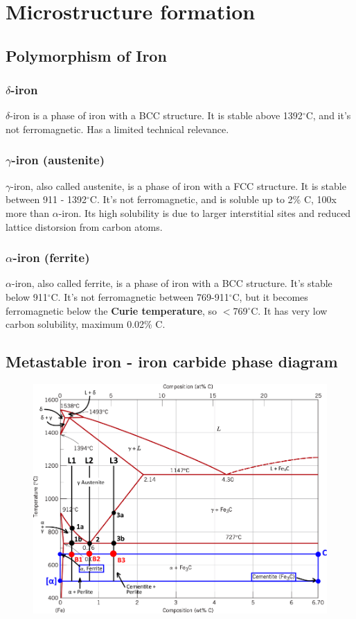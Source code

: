 \documentclass{article}
\begin{document}
\section{Microstructure formation}
\subsection{Polymorphism of Iron}
\subsubsection{$\delta$-iron}
$\delta$-iron is a phase of iron with a BCC structure. It is stable above 1392$^\circ$C, and
it's not ferromagnetic. Has a limited technical relevance.

\subsubsection{$\gamma$-iron (austenite)}
$\gamma$-iron, also called austenite, is a phase of iron with a FCC structure.
It is stable between 911 - 1392$^\circ$C. It's not ferromagnetic, and is soluble up
to 2\% C, 100x more than $\alpha$-iron. Its high solubility is due to larger interstitial
sites and reduced lattice distorsion from carbon atoms.

\subsubsection{$\alpha$-iron (ferrite)}
$\alpha$-iron, also called ferrite, is a phase of iron with a BCC structure.
It's stable below 911$^\circ$C. It's not ferromagnetic between 769-911$^\circ$C, but it
becomes ferromagnetic below the \textbf{Curie temperature}, so $<$769$^\circ$C.
It has very low carbon solubility, maximum 0.02\% C.

\newpage
\subsection{Metastable iron - iron carbide phase diagram}
\begin{figure}[ht!]
  \centering
  \includegraphics[width=\textwidth]{media/iron-castiron_diagram.png}
\end{figure}
\end{document}
